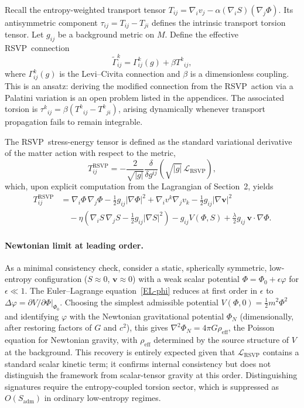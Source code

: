 \documentclass[12pt,a4paper]{article}
\newcommand{\RSVP}{\textrm{RSVP}}
\begin{document}
Recall the entropy-weighted transport tensor $T_{ij}=\nabla_iv_j-\alpha(\nabla_iS)(\nabla_j\Phi)$.
Its antisymmetric component $\tau_{ij}=T_{ij}-T_{ji}$ defines the intrinsic
transport torsion tensor. Let $g_{ij}$ be a background metric on $M$. Define
the effective \RSVP\ connection
\[
\widetilde{\Gamma}^k_{ij} = \Gamma^k_{ij}(g) + \beta T^k{}_{ij},
\]
where $\Gamma^k_{ij}(g)$ is the Levi--Civita connection and $\beta$ is a
dimensionless coupling. This is an ansatz: deriving the modified connection from
the \RSVP\ action via a Palatini variation is an open problem listed in the
appendices. The associated torsion is
$\tau^k{}_{ij}=\beta(T^k{}_{ij}-T^k{}_{ji})$,
arising dynamically whenever transport propagation fails to remain integrable.

The \RSVP\ stress-energy tensor is defined as the standard variational
derivative of the matter action with respect to the metric,
\[
T^\RSVP_{ij}
= -\frac{2}{\sqrt{|g|}}\frac{\delta}{\delta g^{ij}}\!\left(\sqrt{|g|}\,\mathcal{L}_\RSVP\right),
\]
which, upon explicit computation from the Lagrangian of Section~2, yields
\begin{align*}
T^\RSVP_{ij}
&= \nabla_i\Phi\,\nabla_j\Phi
- \tfrac{1}{2}g_{ij}|\nabla\Phi|^2
+ \nabla_iv^k\nabla_jv_k
- \tfrac{1}{2}g_{ij}|\nabla\mathbf{v}|^2\\
&\quad
- \eta\!\left(\nabla_iS\,\nabla_jS-\tfrac{1}{2}g_{ij}|\nabla S|^2\right)
- g_{ij}V(\Phi,S)
+ \tfrac{\lambda}{2}g_{ij}\,\mathbf{v}\cdot\nabla\Phi.
\end{align*}

\paragraph{Newtonian limit at leading order.}
As a minimal consistency check, consider a static, spherically symmetric,
low-entropy configuration ($S\approx 0$, $\mathbf{v}\approx 0$) with a weak
scalar potential $\Phi=\Phi_0+\epsilon\varphi$ for $\epsilon\ll 1$. The
Euler--Lagrange equation~\eqref{EL-phi} reduces at first order in $\epsilon$
to $\Delta\varphi = \partial V/\partial\Phi|_{\Phi_0}$. Choosing the simplest
admissible potential $V(\Phi,0)=\frac{1}{2}m^2\Phi^2$ and identifying $\varphi$
with the Newtonian gravitational potential $\Phi_N$ (dimensionally, after
restoring factors of $G$ and $c^2$), this gives
$\nabla^2\Phi_N = 4\pi G\rho_\mathrm{eff}$,
the Poisson equation for Newtonian gravity, with $\rho_\mathrm{eff}$
determined by the source structure of $V$ at the background. This recovery
is entirely expected given that $\mathcal{L}_\RSVP$ contains a standard
scalar kinetic term; it confirms internal consistency but does not distinguish
the framework from scalar-tensor gravity at this order. Distinguishing
signatures require the entropy-coupled torsion sector, which is suppressed as
$O(S_\mathrm{adm})$ in ordinary low-entropy regimes.
\end{document}

